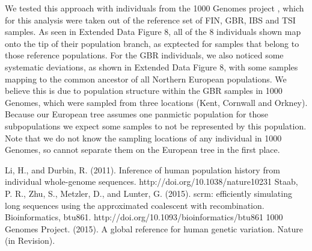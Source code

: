 \documentclass[a4paper]{article}
\begin{document}
We tested this approach with individuals from the 1000 Genomes project \cite{GenomesProject:2015vv}, which for this analysis were taken out of the reference set of FIN, GBR, IBS and TSI samples. As seen in Extended Data Figure 8, all of the 8 individuals shown map onto the tip of their population branch, as exptected for samples that belong to those reference populations. For the GBR individuals, we also noticed some systematic deviations, as shown in Extended Data Figure 8, with some samples mapping to the common ancestor of all Northern European populations. We believe this is due to population structure within the GBR samples in 1000 Genomes, which were sampled from three locations (Kent, Cornwall and Orkney). Because our European tree assumes one panmictic population for those subpopulations we expect some samples to not be represented by this population. Note that we do not know the sampling locations of any individual in 1000 Genomes, so cannot separate them on the European tree in the first place.


\begin{thebibliography}{1}
	 Li, H., and Durbin, R. (2011). Inference of human population history from individual whole-genome sequences. http://doi.org/10.1038/nature10231
     Staab, P. R., Zhu, S., Metzler, D., and Lunter, G. (2015). scrm: efficiently simulating long sequences using the approximated coalescent with recombination. Bioinformatics, btu861. http://doi.org/10.1093/bioinformatics/btu861
     1000 Genomes Project. (2015). A global reference for human genetic variation. Nature (in Revision).
\end{thebibliography}
\end{document}
